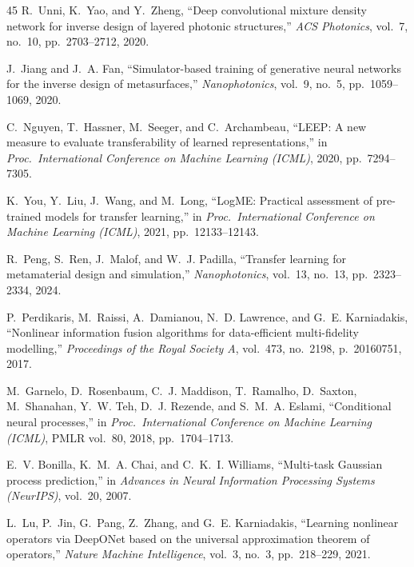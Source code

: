 \documentclass[a4paper,fleqn]{cas-sc}
\begin{document}
\begin{thebibliography}{45}
R.~Unni, K.~Yao, and Y.~Zheng, ``Deep convolutional mixture density network for inverse design of layered photonic structures,'' \textit{ACS Photonics}, vol.~7, no.~10, pp.~2703--2712, 2020.

J.~Jiang and J.~A. Fan, ``Simulator-based training of generative neural networks for the inverse design of metasurfaces,'' \textit{Nanophotonics}, vol.~9, no.~5, pp.~1059--1069, 2020.

C.~Nguyen, T.~Hassner, M.~Seeger, and C.~Archambeau, ``LEEP: A new measure to evaluate transferability of learned representations,'' in \textit{Proc.\ International Conference on Machine Learning (ICML)}, 2020, pp.~7294--7305.

K.~You, Y.~Liu, J.~Wang, and M.~Long, ``LogME: Practical assessment of pre-trained models for transfer learning,'' in \textit{Proc.\ International Conference on Machine Learning (ICML)}, 2021, pp.~12133--12143.

R.~Peng, S.~Ren, J.~Malof, and W.~J. Padilla, ``Transfer learning for metamaterial design and simulation,'' \textit{Nanophotonics}, vol.~13, no.~13, pp.~2323--2334, 2024.

P.~Perdikaris, M.~Raissi, A.~Damianou, N.~D. Lawrence, and G.~E. Karniadakis, ``Nonlinear information fusion algorithms for data-efficient multi-fidelity modelling,'' \textit{Proceedings of the Royal Society A}, vol.~473, no.~2198, p.~20160751, 2017.

M.~Garnelo, D.~Rosenbaum, C.~J. Maddison, T.~Ramalho, D.~Saxton, M.~Shanahan, Y.~W. Teh, D.~J. Rezende, and S.~M.~A. Eslami, ``Conditional neural processes,'' in \textit{Proc.\ International Conference on Machine Learning (ICML)}, PMLR vol.~80, 2018, pp.~1704--1713.

E.~V. Bonilla, K.~M.~A. Chai, and C.~K.~I. Williams, ``Multi-task Gaussian process prediction,'' in \textit{Advances in Neural Information Processing Systems (NeurIPS)}, vol.~20, 2007.

L.~Lu, P.~Jin, G.~Pang, Z.~Zhang, and G.~E. Karniadakis, ``Learning nonlinear operators via DeepONet based on the universal approximation theorem of operators,'' \textit{Nature Machine Intelligence}, vol.~3, no.~3, pp.~218--229, 2021.

\end{thebibliography}
\end{document}
